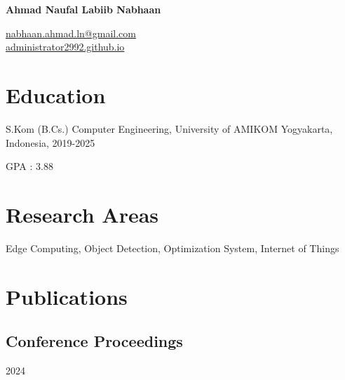 \documentclass[12pt,letterpaper]{report}
\newcommand{\myname}{Ahmad Naufal Labiib Nabhaan}
\newcommand{\namefont}[1]{{\normalfont\bfseries\Huge{#1}}}
\newcommand{\listitemspace}{0.25em}
\renewenvironment{itemize}
{\begin{list}{}{\setlength{\leftmargin}{0em}
                \setlength{\parskip}{0em}
                \setlength{\itemsep}{\listitemspace}
                \setlength{\parsep}{\listitemspace}}}
{\end{list}}
\begin{document}
    \raggedright{}

    \namefont{\myname}

    \vspace{1em}
    \begin{minipage}[t]{0.700\textwidth}
        \href{mailto:nabhaan.ahmad.ln@gmail.com}{nabhaan.ahmad.ln@gmail.com} \\
        \href{https://administrator2992.github.io}{administrator2992.github.io}
    \end{minipage}

    \section*{Education}

    \begin{tablist}
        \item[S.Kom (B.Cs.)] \tab{}Computer Engineering, University of AMIKOM Yogyakarta, Indonesia, 2019-2025 \\
        \item[GPA : 3.88]
    \end{tablist}
    
    \section*{Research Areas}
    \begin{itemize}
        \item Edge Computing, Object Detection, Optimization System, Internet of Things
    \end{itemize}
    
    \section*{Publications}

    \subsection*{Conference Proceedings}
    \begin{tablist}
        \item[2024] \tab{}
    \end{tablist}
\end{document}
